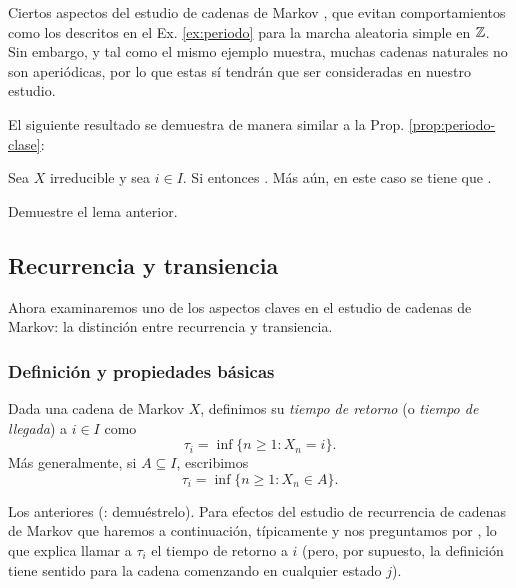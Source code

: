 Ciertos aspectos del estudio de cadenas de Markov , que evitan comportamientos como los descritos en el Ex. \ref{ex:periodo} para la marcha aleatoria simple en $\mathbb{Z}$.
Sin embargo, y tal como el mismo ejemplo muestra, muchas cadenas naturales no son aperiódicas, por lo que estas sí tendrán que ser consideradas en nuestro estudio.

El siguiente resultado se demuestra de manera similar a la Prop. \ref{prop:periodo-clase}:

\begin{lem}
Sea $X$ irreducible y sea $i\in I$.
Si  entonces .
Más aún, en este caso se tiene que .
\end{lem}

\begin{exer}
Demuestre el lema anterior.
\end{exer}

\subsection{Recurrencia y transiencia}

Ahora examinaremos uno de los aspectos claves en el estudio de cadenas de Markov: la distinción entre recurrencia y transiencia.

\subsubsection{Definición y propiedades básicas}

\begin{defn}
Dada una cadena de Markov $X$, definimos su \emph{tiempo de retorno} (o \emph{tiempo de llegada}) a $i\in I$ como
\[\tau_i=\inf\{n\geq1\!:X_n=i\}.\]
Más generalmente, si $A\subseteq I$, escribimos
\[\tau_i=\inf\{n\geq1\!:X_n\in A\}.\]
\end{defn}

Los anteriores  (\uexers: demuéstrelo).
Para efectos del estudio de recurrencia de cadenas de Markov que haremos a continuación, típicamente  y nos preguntamos por , lo que explica llamar a $\tau_i$ el tiempo de retorno a $i$ (pero, por supuesto, la definición tiene sentido para la cadena comenzando en cualquier estado $j$).

